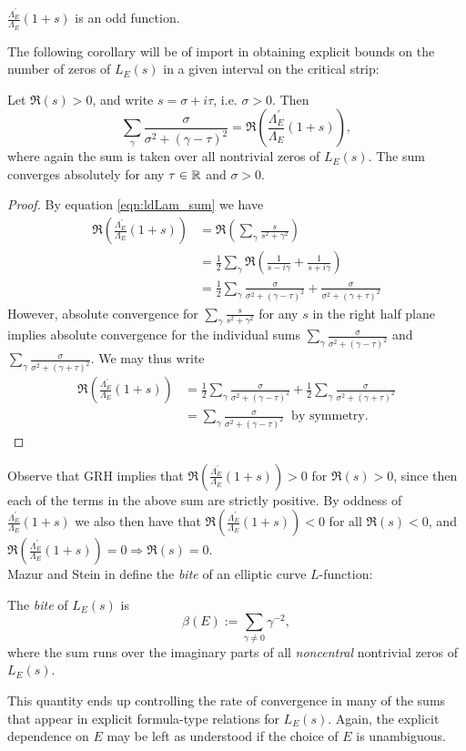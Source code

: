 \documentclass[10pt]{article}
\newcommand{\pr}{^{\prime}}
\newcommand{\Les}{L_E(s)}
\newcommand{\ldLam}[1]{\frac{\Lambda_E\pr}{\Lambda_E}\left(#1\right)}
\begin{document}
\begin{corollary}
$\ldLam{1+s}$ is an odd function.
\end{corollary}

The following corollary will be of import in obtaining explicit bounds on the number of zeros of $L_E(s)$ in a given interval on the critical strip:
\begin{corollary}\label{cor:Re_logderiv}
Let $\Re(s) > 0$, and write $s = \sigma + i\tau$, i.e. $\sigma > 0$. Then
\begin{equation}
\sum_{\gamma} \frac{\sigma}{\sigma^2+(\gamma-\tau)^2} = \Re\left(\ldLam{1+s}\right),
\end{equation}
where again the sum is taken over all nontrivial zeros of $L_E(s)$. The sum converges absolutely for any $\tau \in \mathbb{R}$ and $\sigma > 0$.
\end{corollary}
\begin{proof}
By equation \ref{eqn:ldLam_sum} we have
\begin{align*}
\Re\left(\ldLam{1+s}\right) &= \Re\left(\sum_{\gamma} \frac{s}{s^2+\gamma^2}\right) \\
& = \frac{1}{2} \sum_{\gamma} \Re\left(\frac{1}{s - i \gamma} + \frac{1}{s + i \gamma}\right) \\
&= \frac{1}{2} \sum_{\gamma} \frac{\sigma}{\sigma^2+(\gamma-\tau)^2} +  \frac{\sigma}{\sigma^2+(\gamma+\tau)^2}
\end{align*}
However, absolute convergence for $\sum_{\gamma} \frac{s}{s^2+\gamma^2}$ for any $s$ in the right half plane implies absolute convergence for the individual sums $\sum_{\gamma} \frac{\sigma}{\sigma^2+(\gamma-\tau)^2}$ and $\sum_{\gamma} \frac{\sigma}{\sigma^2+(\gamma+\tau)^2}$. We may thus write
\begin{align*}
\Re\left(\ldLam{1+s}\right) &= \frac{1}{2} \sum_{\gamma} \frac{\sigma}{\sigma^2+(\gamma-\tau)^2} +  \frac{1}{2} \sum_{\gamma}\frac{\sigma}{\sigma^2+(\gamma+\tau)^2} \\
&= \sum_{\gamma} \frac{\sigma}{\sigma^2+(\gamma-\tau)^2} \;\;\text{by symmetry.}
\end{align*}
\end{proof}
Observe that GRH implies that $\Re(\ldLam{1+s})>0$ for $\Re(s)>0$, since then each of the terms in the above sum are strictly positive. By oddness of $\ldLam{1+s}$ we also then have that $\Re(\ldLam{1+s})<0$ for all $\Re(s)<0$, and $\Re(\ldLam{1+s})=0 \Rightarrow \Re(s)=0$. \\

Mazur and Stein in \cite{MaSt-2013} define the {\it bite} of an elliptic curve $L$-function:
\begin{definition}
The {\it bite} of $\Les$ is
\begin{equation}
\beta(E) := \sum_{\gamma \ne 0} \gamma^{-2},
\end{equation}
where the sum runs over the imaginary parts of all {\it noncentral} nontrivial zeros of $\Les$.
\end{definition}
This quantity ends up controlling the rate of convergence in many of the sums that appear in explicit formula-type relations for $\Les$. Again, the explicit dependence on $E$ may be left as understood if the choice of $E$ is unambiguous.
\end{document}
